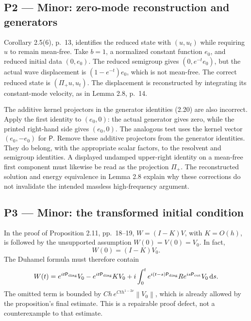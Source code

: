 \documentclass[10pt]{article}
\begin{document}
\subsection*{P2 — Minor: zero-mode reconstruction and generators}
Corollary 2.5(6), p. 13, identifies the reduced state with \((u,u_t)\) while requiring \(u\) to remain mean-free. Take \(b=1\), a normalized constant function \(e_0\), and reduced initial data \((0,e_0)\). The reduced semigroup gives \((0,e^{-t}e_0)\), but the actual wave displacement is \((1-e^{-t})e_0\), which is not mean-free. The correct reduced state is \((\Pi_+u,u_t)\). The displacement is reconstructed by integrating its constant-mode velocity, as in Lemma 2.8, p. 14.\par
The additive kernel projectors in the generator identities (2.20) are also incorrect. Apply the first identity to \((e_0,0)\): the actual generator gives zero, while the printed right-hand side gives \((e_0,0)\). The analogous test uses the kernel vector \((e_0,-e_0)\) for \(\mathsf P\). Remove these additive projectors from the generator identities. They do belong, with the appropriate scalar factors, to the resolvent and semigroup identities. A displayed undamped upper-right identity on a mean-free first component must likewise be read as the projection \(\Pi_+\). The reconstructed solution and energy equivalence in Lemma 2.8 explain why these corrections do not invalidate the intended massless high-frequency argument.\par
\subsection*{P3 — Minor: the transformed initial condition}
In the proof of Proposition 2.11, pp. 18–19, \(W=(I-K)V\), with \(K=O(h)\), is followed by the unsupported assumption \(W(0)=V(0)=V_0\). In fact, \[W(0)=(I-K)V_0.\] The Duhamel formula must therefore contain \[W(t)=e^{it\mathsf P_{\rm diag}}V_0
       -e^{it\mathsf P_{\rm diag}}KV_0
       +i\int_0^t e^{i(t-s)\mathsf P_{\rm diag}}R e^{is\mathsf P_{\rm cut}}V_0\,\mathrm ds .\] The omitted term is bounded by \(Ch\,e^{Cth^{1-2\nu}}\left\|V_0\right\|\), which is already allowed by the proposition’s final estimate. This is a repairable proof defect, not a counterexample to that estimate.\par
\end{document}
